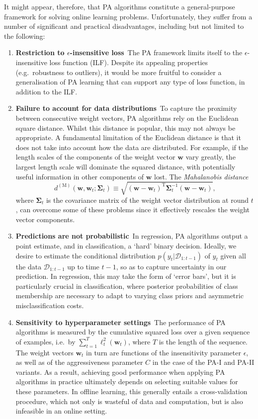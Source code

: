 It might appear, therefore, that PA algorithms constitute a general-purpose framework for solving online learning problems. Unfortunately, they suffer from a number of significant and practical disadvantages, including but not limited to the following:
\begin{enumerate}
	\item \textbf{Restriction to $\epsilon$-insensitive loss}\,
	The PA framework limits itself to the $\epsilon$-insensitive loss function (ILF). Despite its appealing properties (e.g.\ robustness to outliers), it would be more fruitful to consider a generalisation of PA learning that can support any type of loss function, in addition to the ILF.
	\item \textbf{Failure to account for data distributions}\,
	To capture the proximity between consecutive weight vectors, PA algorithms rely on the Euclidean square distance. Whilst this distance is popular, this may not always be appropriate. A fundamental limitation of the Euclidean distance is that it does not take into account how the data are distributed. For example, if the length scales of the components of the weight vector $\mathbf{w}$ vary greatly, the largest length scale will dominate the squared distance, with potentially useful information in other components of $\mathbf{w}$ lost. The \emph{Mahalanobis distance}
\begin{equation}
	d^{(\text{M})}(\mathbf{w}, \mathbf{w}_t; \boldsymbol{\Sigma}_t)
	\equiv \sqrt{(\mathbf{w} - \mathbf{w}_t)^\text{T}\boldsymbol{\Sigma}^{-1}_{t}(\mathbf{w} - \mathbf{w}_t)},
\end{equation}
where $\boldsymbol{\Sigma}_t$ is the covariance matrix of the weight vector distribution at round $t$, can overcome some of these problems since it effectively rescales the weight vector components.
	\item \textbf{Predictions are not probabilistic}\,
	In regression, PA algorithms output a point estimate, and in classification, a `hard' binary decision. Ideally, we desire to estimate the conditional distribution $p(y_t | \mathcal{D}_{1:t-1})$ of $y_t$ given all the data $\mathcal{D}_{1:t-1}$ up to time $t-1$, so as to capture uncertainty in our prediction. In regression, this may take the form of `error bars', but it is particularly crucial in classification, where posterior probabilities of class membership are necessary to adapt to varying class priors and asymmetric misclassification costs.
	\item \textbf{Sensitivity to hyperparameter settings}\,
	The performance of PA algorithms is measured by the cumulative squared loss over a given sequence of examples, i.e.\ by $\sum_{t=1}^T \ell_t^2(\mathbf{w}_t)$, where $T$ is the length of the sequence. The weight vectors $\mathbf{w}_t$ in turn are functions of the insensitivity parameter $\epsilon$, as well as of the aggressiveness parameter $C$ in the case of the PA-I and PA-II variants. As a result, achieving good performance when applying PA algorithms in practice ultimately depends on selecting suitable values for these parameters. In offline learning, this generally entails a cross-validation procedure, which not only is wasteful of data and computation, but is also infeasible in an online setting.
\end{enumerate}
